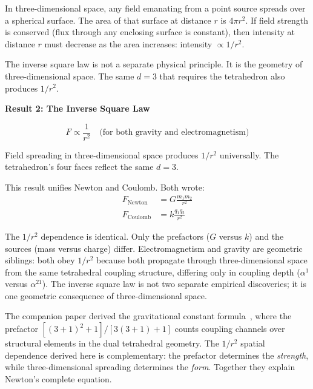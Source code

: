 \documentclass[aps,prd,preprint,superscriptaddress,showpacs,preprintnumbers,amsmath,amssymb,nofootinbib]{revtex4-2}
\begin{document}
In three-dimensional space, any field emanating from a point source spreads over a spherical surface. The area of that surface at distance $r$ is $4\pi r^2$. If field strength is conserved (flux through any enclosing surface is constant), then intensity at distance $r$ must decrease as the area increases: intensity $\propto 1/r^2$.

The inverse square law is not a separate physical principle. It is the geometry of three-dimensional space. The same $d = 3$ that requires the tetrahedron also produces $1/r^2$.

\vspace{1.5em}
\noindent
\colorbox{resultgreen}{\parbox{\dimexpr\textwidth-2\fboxsep\relax}{%
\vspace{0.8em}
\centering
\textbf{\large Result 2: The Inverse Square Law}

\vspace{0.5em}
\boldmath
\begin{equation}
F \propto \frac{1}{r^2} \quad \text{(for both gravity and electromagnetism)}
\end{equation}
\unboldmath

\vspace{0.3em}
Field spreading in three-dimensional space produces $1/r^2$ universally. The tetrahedron's four faces reflect the same $d = 3$.
\vspace{0.5em}
}}
\vspace{1cm}

This result unifies Newton and Coulomb. Both wrote:
\begin{align}
F_{\text{Newton}} &= G\frac{m_1 m_2}{r^2} \\[0.5em]
F_{\text{Coulomb}} &= k\frac{q_1 q_2}{r^2}
\end{align}

The $1/r^2$ dependence is identical. Only the prefactors ($G$ versus $k$) and the sources (mass versus charge) differ. Electromagnetism and gravity are geometric siblings: both obey $1/r^2$ because both propagate through three-dimensional space from the same tetrahedral coupling structure, differing only in coupling depth ($\alpha^1$ versus $\alpha^{21}$). The inverse square law is not two separate empirical discoveries; it is one geometric consequence of three-dimensional space.

The companion paper derived the gravitational constant formula~\cite{paper6}, where the prefactor $[(3+1)^2+1]/[3(3+1)+1]$ counts coupling channels over structural elements in the dual tetrahedral geometry. The $1/r^2$ spatial dependence derived here is complementary: the prefactor determines the \emph{strength}, while three-dimensional spreading determines the \emph{form}. Together they explain Newton's complete equation.
\end{document}
